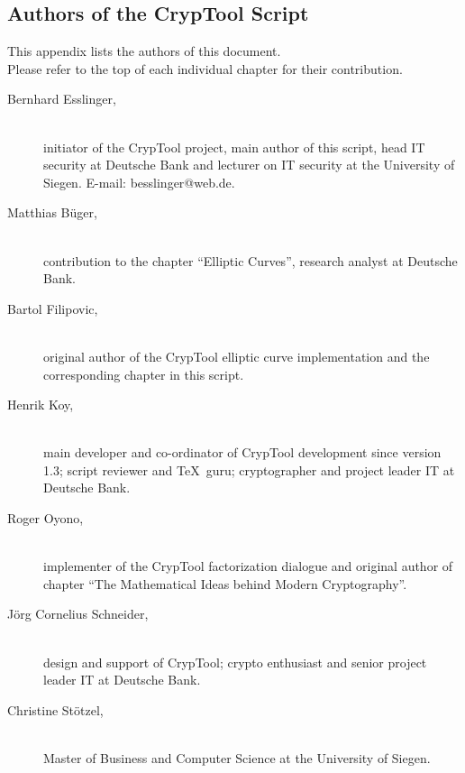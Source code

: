 
\subsection{Authors of the CrypTool Script}
\hypertarget{appendix-authors}{}\label{s:appendix-authors}

This appendix lists the authors of this document.\\
Please refer to the top of each individual chapter for their contribution.

\begin{description}

\item[Bernhard Esslinger,] \mbox{}\\
initiator of the CrypTool project, main author of this script, head IT security
at Deutsche Bank and lecturer on IT security at the University of Siegen.
E-mail: besslinger@web.de.
 
\item[Matthias B\"uger,] \mbox{}\\ 
contribution to the chapter ``Elliptic Curves'', research analyst at Deutsche Bank.

\item[Bartol Filipovic,] \mbox{}\\
original author of the CrypTool elliptic curve
implementation and the corresponding chapter in this script.

\item[Henrik Koy, ] \mbox{}\\
main developer and co-ordinator of CrypTool development
since version 1.3; script reviewer and \TeX\ guru; cryptographer 
and project leader IT at Deutsche Bank.

\item[Roger Oyono, ] \mbox{}\\
implementer of the CrypTool factorization dialogue and
original author of chapter ``The Mathematical Ideas behind Modern
Cryptography''.

\item[J\"org Cornelius Schneider,] \mbox{}\\
design and support of CrypTool; crypto
enthusiast and senior project leader IT at Deutsche Bank.

\item[Christine St\"otzel,] \mbox{}\\
Master of Business and Computer Science at the University of Siegen.

\end{description}








